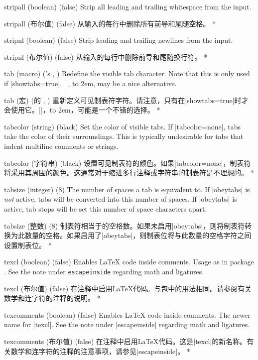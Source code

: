 \begin{optionlist}
\begin{paracol}{2}
  \item[stripall (boolean) (false)]
    Strip all leading and trailing whitespace from the input.
    \switchcolumn
    \item[stripall (布尔值) (false)]
    从输入的每行中删除所有前导和尾随空格。
\switchcolumn[0]*%
  \item[stripnl (boolean) (false)]
    Strip leading and trailing newlines from the input.
    \switchcolumn
    \item[stripnl (布尔值) (false)]
    从输入的每行中删除前导和尾随换行符。
    \switchcolumn[0]*%
\item[tab (macro) ({\rmfamily\pkg{fancyvrb}'s} \string\FancyVerbTab, \FancyVerbTab)]
Redefine the visible tab character.  Note that this is only used if |showtabs=true|.  |\rightarrowfill|, \hbox to 2em{\rightarrowfill}, may be a nice alternative.
\switchcolumn
\item[tab (宏) ({\rmfamily\pkg{fancyvrb}的} \string\FancyVerbTab, \FancyVerbTab)]
重新定义可见制表符字符。请注意，只有在|showtabs=true|时才会使用它。|\rightarrowfill|，\hbox to 2em{\rightarrowfill}，可能是一个不错的选择。
\switchcolumn[0]*%
\item[tabcolor (string) (black)]
Set the color of visible tabs.  If |tabcolor=none|, tabs take the color of their surroundings.  This is typically undesirable for tabs that indent multiline comments or strings.
\switchcolumn
\item[tabcolor (字符串) (black)]
设置可见制表符的颜色。如果|tabcolor=none|，制表符将采用其周围的颜色。这通常对于缩进多行注释或字符串的制表符是不理想的。
\switchcolumn[0]*%

  \item[tabsize (integer) (8)]
    The number of spaces a tab is equivalent to.  If |obeytabs| is \emph{not} active, tabs will be converted into this number of spaces.  If |obeytabs| is active, tab stops will be set this number of space characters apart.
    \switchcolumn
    \item[tabsize (整数) (8)]
    制表符相当于的空格数。如果未启用|obeytabs|，则将制表符转换为此数量的空格。如果启用了|obeytabs|，则制表位将与此数量的空格字符之间设置制表位。
\switchcolumn[0]*%
  \item[texcl (boolean) (false)]
    Enables \LaTeX{} code inside comments.
    Usage as in package .  See the note under \texttt{escapeinside} regarding math and ligatures.
    \switchcolumn
    \item[texcl (布尔值) (false)]
    在注释中启用\LaTeX{}代码。与包中的用法相同。请参阅有关数学和连字符的注释的说明。
\switchcolumn[0]*%
  \item[texcomments (boolean) (false)]
    Enables \LaTeX{} code inside comments.  The newer name for |texcl|.  See the note under |escapeinside| regarding math and ligatures.
    \switchcolumn
    \item[texcomments (布尔值) (false)]
    在注释中启用\LaTeX{}代码。这是|texcl|的新名称。有关数学和连字符的注释的注意事项，请参见|escapeinside|。
\switchcolumn[0]*%


\end{paracol}
\end{optionlist}
